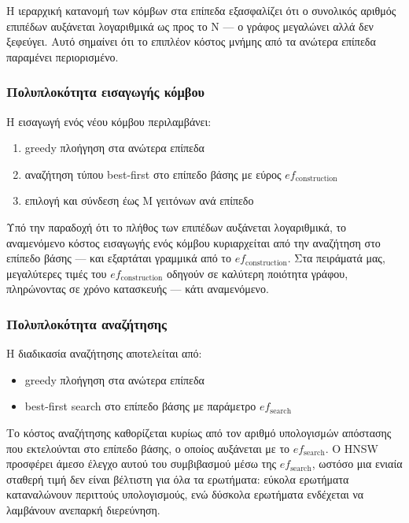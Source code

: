 \documentclass[12pt,a4paper]{article}
\begin{document}
Η ιεραρχική κατανομή των κόμβων στα επίπεδα εξασφαλίζει ότι ο συνολικός αριθμός επιπέδων αυξάνεται λογαριθμικά ως προς το Ν --- ο γράφος μεγαλώνει αλλά δεν ξεφεύγει. Αυτό σημαίνει ότι το επιπλέον κόστος μνήμης από τα ανώτερα επίπεδα παραμένει περιορισμένο.

\subsubsection{Πολυπλοκότητα εισαγωγής κόμβου}
Η εισαγωγή ενός νέου κόμβου περιλαμβάνει:
\begin{enumerate}
    \item {}greedy πλοήγηση στα ανώτερα επίπεδα
    \item αναζήτηση τύπου best-first στο επίπεδο βάσης με εύρος  $ef_{\text{construction}}$
    \item επιλογή και σύνδεση έως Μ γειτόνων ανά επίπεδο
\end{enumerate}

Υπό την παραδοχή ότι το πλήθος των επιπέδων αυξάνεται λογαριθμικά, το αναμενόμενο κόστος εισαγωγής ενός κόμβου κυριαρχείται από την αναζήτηση στο επίπεδο βάσης --- και εξαρτάται γραμμικά από το $ef_{\text{construction}}$. Στα πειράματά μας, μεγαλύτερες τιμές του
$ef_{\text{construction}}$ οδηγούν σε καλύτερη ποιότητα γράφου, πληρώνοντας σε χρόνο κατασκευής --- κάτι αναμενόμενο.

\subsubsection{Πολυπλοκότητα αναζήτησης}
Η διαδικασία αναζήτησης αποτελείται από:
\begin{itemize}
    \item {}greedy πλοήγηση στα ανώτερα επίπεδα
    \item {}best-first search στο επίπεδο βάσης με παράμετρο $ef_{\text{search}}$
\end{itemize}
Το κόστος αναζήτησης καθορίζεται κυρίως από τον αριθμό υπολογισμών απόστασης που εκτελούνται στο επίπεδο βάσης, ο οποίος αυξάνεται με το $ef_{\text{search}}$. Ο HNSW προσφέρει άμεσο έλεγχο αυτού του συμβιβασμού μέσω της $ef_{\text{search}}$, ωστόσο μια ενιαία σταθερή τιμή δεν είναι βέλτιστη για όλα τα ερωτήματα: εύκολα ερωτήματα καταναλώνουν περιττούς υπολογισμούς, ενώ δύσκολα ερωτήματα ενδέχεται να λαμβάνουν ανεπαρκή διερεύνηση.
\end{document}
